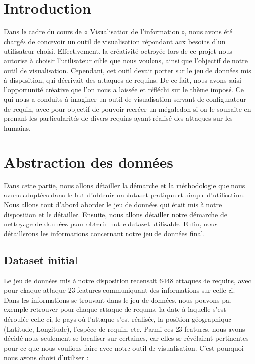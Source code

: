 \documentclass{article}
\begin{document}
\clearpage
\section{Introduction}

Dans le cadre du cours de « Visualisation de l’information », nous avons été chargés de concevoir un outil de visualisation répondant aux besoins d’un utilisateur choisi. Effectivement, la créativité octroyée lors de ce projet nous autorise à choisir l’utilisateur cible que nous voulons, ainsi que l’objectif de notre outil de visualisation. Cependant, cet outil devait porter sur le jeu de données mis à disposition, qui décrivait des attaques de requins.
De ce fait, nous avons saisi l’opportunité créative que l’on nous a laissée et réfléchi sur le thème imposé. Ce qui nous a conduits à imaginer un outil de visualisation servant de configurateur de requin, avec pour objectif de pouvoir recréer un mégalodon si on le souhaite en prenant les particularités de divers requins ayant réalisé des attaques sur les humains.

\clearpage
\section{Abstraction des données}

Dans cette partie, nous allons détailler la démarche et la méthodologie que nous avons adoptées dans le but d’obtenir un dataset pratique et simple d’utilisation. Nous allons tout d’abord aborder le jeu de données qui était mis à notre disposition et le détailler. Ensuite, nous allons détailler notre démarche de nettoyage de données pour obtenir notre dataset utilisable. Enfin, nous détaillerons les informations concernant notre jeu de données final.

\subsection{Dataset initial}

Le jeu de données mis à notre disposition recensait 6448 attaques de requins, avec pour chaque attaque 23 features communiquant des informations sur celle-ci. Dans les informations se trouvant dans le jeu de données, nous pouvons par exemple retrouver pour chaque attaque de requins, la date à laquelle s’est déroulée celle-ci, le pays où l’attaque s’est réalisée, la position géographique (Latitude, Longitude), l’espèce de requin, etc.
Parmi ces 23 features, nous avons décidé nous seulement se focaliser sur certaines, car elles se révélaient pertinentes pour ce que nous voulions faire avec notre outil de visualisation.
C’est pourquoi nous avons choisi d’utiliser :
\end{document}
